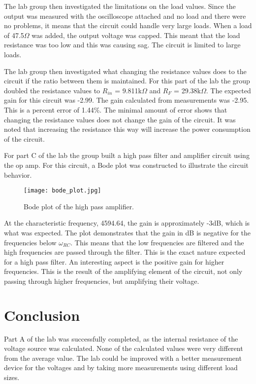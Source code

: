 \documentclass[twocolumn, amsmath]{revtex4}
\begin{document}
The lab group then investigated the limitations on the load values. Since the output was measured with the oscilloscope attached and no load and there were no problems, it means that the circuit could handle very large loads. When a load of 47.5$\Omega$ was added, the output voltage was capped. This meant that the load resistance was too low and this was causing sag. The circuit is limited to large loads. 

The lab group then investigated what changing the resistance values does to the circuit if the ratio between them is maintained. For this part of the lab the group doubled the resistance values to $R_{in}$ = 9.811k$\Omega$ and $R_{F}$ = 29.38k$\Omega$. The expected gain for this circuit was -2.99. The gain calculated from measurements was -2.95. This is a percent error of  1.44\%. The minimal amount of error shows that changing the resistance values does not change the gain of the circuit. It was noted that increasing the resistance this way will increase the power consumption of the circuit.

For part C of the lab the group built a high pass filter and amplifier circuit using the op amp. For this circuit, a Bode plot was constructed to illustrate the circuit behavior.

\begin{figure}[h]
    \texttt{[image: bode\_plot.jpg]}  
    \caption{Bode plot of the high pass amplifier.}
\end{figure}

At the characteristic frequency, 4594.64, the gain is approximately -3dB, which is what was expected. The plot demonstrates that the gain in dB is negative for the frequencies below $\omega_{RC}$. This means that the low frequencies are filtered and the high frequencies are passed through the filter. This is the exact nature expected for a high pass filter. An interesting aspect is the positive gain for higher frequencies. This is the result of the amplifying element of the circuit, not only passing through higher frequencies, but amplifying their voltage.

\section{Conclusion}
Part A of the lab was successfully completed, as the internal resistance of the voltage source was calculated. None of the calculated values were very different from the average value. The lab could be improved with a better measurement device for the voltages and by taking more measurements using different load sizes.
\end{document}
